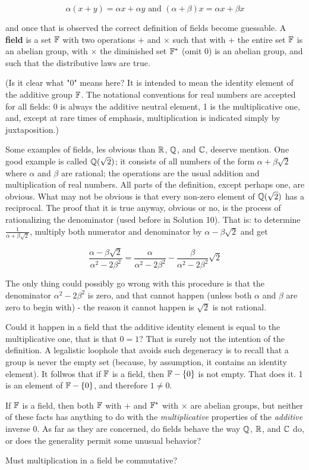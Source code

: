 \begin{equation}
    \alpha(x+y) = \alpha x + \alpha y \text{ and } (\alpha + \beta) x = \alpha x + \beta x
\end{equation}

and once that is observed the correct definition of fields become guessable. A \textbf{field} is a set $\mathbb{F}$ with two operations $+$ and $\times$ such that with $+$ the entire set $\mathbb{F}$ is an abelian group, with $\times$ the diminished set $\mathbb{F}^\ast$ (omit 0) is an abelian group, and such that the distributive laws are true.

(Is it clear what "0" means here? It is intended to mean the identity element of the additive group $\mathbb{F}$. The notational conventions for real numbers are accepted for all fields: 0 is always the additive neutral element, 1 is the multiplicative one, and, except at rare times of emphasis, multiplication is indicated simply by juxtaposition.)

Some examples of fields, les obvious than $\mathbb{R}$, $\mathbb{Q}$, and $\mathbb{C}$, deserve mention. One good example is called $\mathbb{Q}(\sqrt{2})$; it consists of all numbers of the form $\alpha + \beta \sqrt{2}$ where $\alpha$ and $\beta$ are rational; the operations are the usual addition and multiplication of real numbers. All parts of the definition, except perhaps one, are obvious. What may not be obvious is that every non-zero element of $\mathbb{Q}(\sqrt{2})$ has a reciprocal. The proof that it is true anyway, obvious or no, is the process of rationalizing the denominator (used before in Solution 10). That is: to determine $\frac{1}{\alpha + \beta \sqrt{2}}$, multiply both numerator and denominator by $\alpha - \beta \sqrt{2}$ and get

\begin{equation}
    \frac{\alpha-\beta \sqrt{2}}{\alpha^2 - 2\beta^2} = \frac{\alpha}{\alpha^2 - 2\beta^2} - \frac{\beta}{\alpha^2 - 2\beta^2}\sqrt{2}
\end{equation}

The only thing could possibly go wrong with this procedure is that the denominator $\alpha^2 - 2\beta^2$ is zero, and that cannot happen (unless both $\alpha$ and $\beta$ are zero to begin with) - the reason it cannot happen is $\sqrt{2}$ is not rational.

Could it happen in a field that the additive identity element is equal to the multiplicative one, that is that $0 = 1$? That is surely not the intention of the definition. A legalistic loophole that avoids such degeneracy is to recall that a group is never the empty set (because, by assumption, it contains an identity element). It follwos that if $\mathbb{F}$ is a field, then $\mathbb{F} - \{0\}$ is not empty. That does it. 1 is an element of $\mathbb{F} - \{0\}$, and therefore $1 \neq 0$.

If $\mathbb{F}$ is a field, then both $\mathbb{F}$ with $+$ and $\mathbb{F}^\ast$ with $\times$ are abelian groups, but neither of these facts has anything to do with the \textit{multiplicative} properties of the \textit{additive} inverse 0. As far as they are concerned, do fields behave the way $\mathbb{Q}$, $\mathbb{R}$, and $\mathbb{C}$ do, or does the generality permit some unusual behavior?

\begin{problem}
Must multiplication in a field be commutative?
\end{problem}